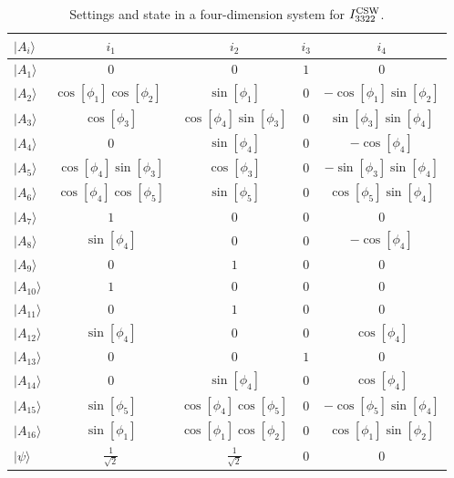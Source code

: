 \documentclass[pra,aps,notitlepage,superscriptaddress,showpacs,showkeys]{revtex4-1}
\theoremstyle{definition}
\theoremstyle{remark}
\begin{document}
\begin{table}[t]
\centering
 \caption{Settings and state in a four-dimension system for $I_{3322}^{\rm CSW}$.}
 \begin{tabular}{lcccc} \hline \hline
$|A_i\rangle$ & $i_1$ & $i_2$ & $i_3$ & $i_4$  \\
\hline
$|A_1\rangle$  & $0$ & $0$ & $1$ & $0$  \\
$|A_2\rangle$  & $\cos{[\phi_1]}\cos{[\phi_2]}\ \ $ & $\sin{[\phi_1]}$ & $0$ & $-\cos{[\phi_1]}\sin{[\phi_2]}$\\
$|A_3\rangle$  & $\cos{[\phi_3]}$ & $\cos{[\phi_4]}\sin{[\phi_3]}$ & $0$ & $\sin{[\phi_3]}\sin{[\phi_4]}$ \\
$|A_4\rangle$  & $0$ & $\sin{[\phi_4]}$ & $0$ & $-\cos{[\phi_4]}$ \\
$|A_5\rangle$  & $\cos{[\phi_4]}\sin{[\phi_3]}$ & $\cos{[\phi_3]}$ & $0$ & $-\sin{[\phi_3]}\sin{[\phi_4]}$ \\
$|A_6\rangle$  & $\cos{[\phi_4]}\cos{[\phi_5]}$ & $\sin{[\phi_5]}$ & $0$ & $\cos{[\phi_5]}\sin{[\phi_4]}$ \\
$|A_7\rangle$  & $1$ & $0$ & $0$ & $0$ \\
$|A_8\rangle$  & $\sin{[\phi_4]}$ & $0$ & $0$ & $-\cos{[\phi_4]}$  \\
$|A_9\rangle$  & $0$ & $1$ & $0$ & $0$  \\
$|A_{10}\rangle$ & $1$ & $0$ & $0$ & $0$  \\
$|A_{11}\rangle$ & $0$ & $1$ & $0$ & $0$  \\
$|A_{12}\rangle$ & $\sin{[\phi_4]}$ & $0$ & $0$ & $\cos{[\phi_4]}$  \\
$|A_{13}\rangle$ & $0$ & $0$ & $1$ & $0$ \\
$|A_{14}\rangle$ & $0$ & $\sin{[\phi_4]}$ & $0$ & $\cos{[\phi_4]}$  \\
$|A_{15}\rangle$ & $\sin{[\phi_5]}$ & $\cos{[\phi_4]}\cos{[\phi_5]}$ & $0$ & $-\cos{[\phi_5]}\sin{[\phi_4]}$  \\
$|A_{16}\rangle$ & $\sin{[\phi_1]}$ & $\cos{[\phi_1]}\cos{[\phi_2]}$ & $0$ & $\cos{[\phi_1]}\sin{[\phi_2]}$  \\
\hline
$|\psi\rangle$ & $\frac{1}{\sqrt{2}}$ & $\frac{1}{\sqrt{2}}$ & $0$ & $0$\\
  \hline \hline
   \end{tabular}
\label{four-dimension}
\end{table}
\end{document}
